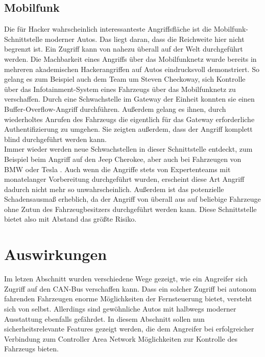 \subsection{Mobilfunk}
Die für Hacker wahrscheinlich interessanteste Angriffsfläche ist die Mobilfunk-Schnittstelle moderner Autos. Das liegt daran, dass die Reichweite hier nicht begrenzt ist. Ein Zugriff kann von nahezu überall auf der Welt durchgeführt werden. Die Machbarkeit eines Angriffs über das Mobilfunknetz wurde bereits in mehreren akademischen Hackerangriffen auf Autos eindrucksvoll demonstriert. So gelang es zum Beispiel auch dem Team um Steven Checkoway, sich Kontrolle über das Infotainment-System eines Fahrzeugs über das Mobilfunknetz zu verschaffen. Durch eine Schwachstelle im Gateway der Einheit konnten sie einen Buffer-Overflow-Angriff durchführen. Außerdem gelang es ihnen, durch wiederholtes Anrufen des Fahrzeugs die eigentlich für das Gateway erforderliche Authentifizierung zu umgehen. Sie zeigten außerdem, dass der Angriff komplett blind durchgeführt werden kann. \cite[11]{Checkoway.2011} \\
Immer wieder werden neue Schwachstellen in dieser Schnittstelle entdeckt, zum Beispiel beim Angriff auf den Jeep Cherokee, aber auch bei Fahrzeugen von BMW oder Tesla \cite[35]{Wurm.2022}. Auch wenn die Angriffe stets von Expertenteams mit monatelanger Vorbereitung durchgeführt wurden, erscheint diese Art Angriff dadurch nicht mehr so unwahrscheinlich. Außerdem ist das potenzielle Schadensausmaß erheblich, da der Angriff von überall aus auf beliebige Fahrzeuge ohne Zutun des Fahrzeugbesitzers durchgeführt werden kann. Diese Schnittstelle bietet also mit Abstand das größte Risiko.



\section{Auswirkungen}
Im letzen Abschnitt wurden verschiedene Wege gezeigt, wie ein Angreifer sich Zugriff auf den \acs{CAN}-Bus verschaffen kann. Dass ein solcher Zugriff bei autonom fahrenden Fahrzeugen enorme Möglichkeiten der Fernsteuerung bietet, versteht sich von selbst. Allerdings sind gewöhnliche Autos mit halbwegs moderner Ausstattung ebenfalls gefährdet. In diesem Abschnitt sollen nun sicherheitsrelevante Features gezeigt werden, die dem Angreifer bei erfolgreicher Verbindung zum Controller Area Network Möglichkeiten zur Kontrolle des Fahrzeugs bieten.


